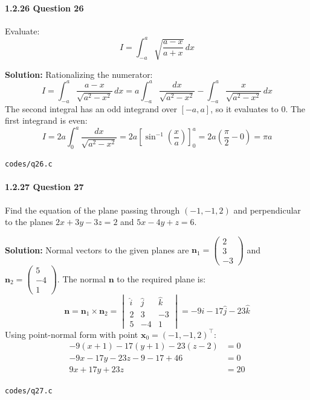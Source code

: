 \documentclass{article}
\begin{document}
\paragraph{1.2.26 Question 26}
Evaluate:
\begin{equation}
I = \int_{-a}^a \sqrt{\frac{a - x}{a + x}} \, dx
\end{equation}

\textbf{Solution:} Rationalizing the numerator:
\begin{equation}
I = \int_{-a}^a \frac{a - x}{\sqrt{a^2 - x^2}} \, dx = a \int_{-a}^a \frac{dx}{\sqrt{a^2 - x^2}} - \int_{-a}^a \frac{x}{\sqrt{a^2 - x^2}} \, dx
\end{equation}
The second integral has an odd integrand over $[-a, a]$, so it evaluates to $0$. The first integrand is even:
\begin{equation}
I = 2a \int_0^a \frac{dx}{\sqrt{a^2 - x^2}} = 2a \left[ \sin^{-1}\left(\frac{x}{a}\right) \right]_0^a = 2a\left(\frac{\pi}{2} - 0\right) = \pi a
\end{equation}
\begin{tcolorbox}[colback=gray!10,colframe=black,width=\linewidth]
\texttt{codes/q26.c}
\end{tcolorbox}

\paragraph{1.2.27 Question 27}
Find the equation of the plane passing through $(-1, -1, 2)$ and perpendicular to the planes $2x + 3y - 3z = 2$ and $5x - 4y + z = 6$.

\textbf{Solution:} Normal vectors to the given planes are $\mathbf{n}_1 = \begin{pmatrix} 2 \\ 3 \\ -3 \end{pmatrix}$ and $\mathbf{n}_2 = \begin{pmatrix} 5 \\ -4 \\ 1 \end{pmatrix}$.
The normal $\mathbf{n}$ to the required plane is:
\begin{equation}
\mathbf{n} = \mathbf{n}_1 \times \mathbf{n}_2 = \begin{vmatrix} \hat{i} & \hat{j} & \hat{k} \\ 2 & 3 & -3 \\ 5 & -4 & 1 \end{vmatrix} = -9\hat{i} - 17\hat{j} - 23\hat{k}
\end{equation}
Using point-normal form with point $\mathbf{x}_0 = (-1, -1, 2)^\top$:
\begin{align}
-9(x + 1) - 17(y + 1) - 23(z - 2) &= 0 \\
-9x - 17y - 23z - 9 - 17 + 46 &= 0 \\
9x + 17y + 23z &= 20
\end{align}
\begin{tcolorbox}[colback=gray!10,colframe=black,width=\linewidth]
\texttt{codes/q27.c}
\end{tcolorbox}
\end{document}
